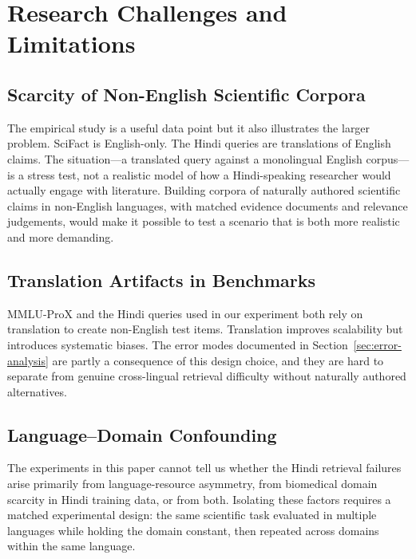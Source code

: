 \documentclass[acmsmall,screen,review]{acmart}
\begin{document}

\section{Research Challenges and Limitations}
\label{sec:challenges}

\subsection{Scarcity of Non-English Scientific Corpora}
\label{sec:corpora}

The empirical study is a useful data point but it also illustrates the
larger problem.  SciFact is English-only.  The Hindi queries are
translations of English claims.  The situation---a translated query against
a monolingual English corpus---is a stress test, not a realistic model of
how a Hindi-speaking researcher would actually engage with literature.
Building corpora of naturally authored scientific claims in non-English
languages, with matched evidence documents and relevance judgements, would
make it possible to test a scenario that is both more realistic and more
demanding.

\subsection{Translation Artifacts in Benchmarks}
\label{sec:translation}

MMLU-ProX \citep{xuan2025mmlupro} and the Hindi queries used in our
experiment both rely on translation to create non-English test items.
Translation improves scalability but introduces systematic biases.  The
error modes documented in Section~\ref{sec:error-analysis} are partly a
consequence of this design choice, and they are hard to separate from
genuine cross-lingual retrieval difficulty without naturally authored
alternatives.

\subsection{Language--Domain Confounding}
\label{sec:confounding}

The experiments in this paper cannot tell us whether the Hindi retrieval
failures arise primarily from language-resource asymmetry, from
biomedical domain scarcity in Hindi training data, or from both.  Isolating
these factors requires a matched experimental design: the same scientific
task evaluated in multiple languages while holding the domain constant,
then repeated across domains within the same language.
\end{document}
